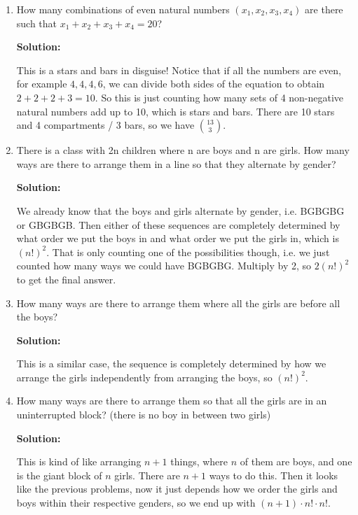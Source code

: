 \documentclass{article}
\newenvironment{solution}{

        \color{blue} \smallskip \textbf{Solution:}

    }{}
\begin{document}
\begin{enumerate}
    \item How many combinations of even natural numbers $(x_1,x_2,x_3,x_4)$ are there such that
    $x_1 + x_2 + x_3 + x_4 = 20$?
    \begin{solution}
    This is a stars and bars in disguise! Notice that if all the numbers are even, for example $4, 4, 4, 6$, we can divide both sides
    of the equation to obtain $2 + 2 + 2 + 3 = 10$. So this is just counting how many sets of 4 non-negative natural numbers add up to 10, which is stars and bars.
    There are 10 stars and 4 compartments / 3 bars, so we have ${13 \choose 3}$.
    \end{solution}

    \item There is a class with 2n children where n are boys and n are girls. How many ways are there to arrange them in a line so that they alternate by gender?
    \begin{solution}
    We already know that the boys and girls alternate by gender, i.e. BGBGBG or GBGBGB. Then either of these sequences are completely
    determined by what order we put the boys in and what order we put the girls in, which is $(n!)^2$. That is only counting one of the
    possibilities though, i.e. we just counted how many ways we could have BGBGBG. Multiply by 2, so $2 (n!)^2$ to get the final answer.
    \end{solution}

    \item How many ways are there to arrange them where all the girls are before all the boys?
    \begin{solution}
    This is a similar case, the sequence is completely determined by how we arrange the girls independently from arranging the boys, so $(n!)^2$.
    \end{solution}

    \item How many ways are there to arrange them so that all the girls are in an uninterrupted block? (there is no boy in between two girls)
    \begin{solution}
    This is kind of like arranging $n+1$ things, where $n$ of them are boys, and one is the giant block of $n$ girls. There are $n+1$ ways to do this.
    Then it looks like the previous problems, now it just depends how we order the girls and boys within their respective genders, so we end up with
    $(n+1) \cdot n! \cdot n!$.
    \end{solution}


\end{enumerate}
\end{document}
